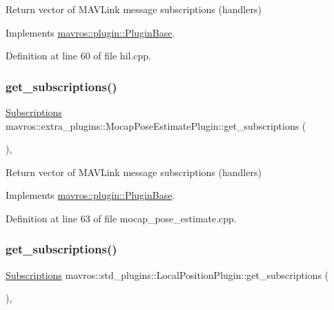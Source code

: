 Return vector of M\+A\+V\+Link message subscriptions (handlers) 



Implements \mbox{\hyperlink{group__plugin_gaf4e23fec6d7436a62cbf0942a2e5791c}{mavros\+::plugin\+::\+Plugin\+Base}}.



Definition at line 60 of file hil.\+cpp.

\mbox{\label{group__plugin_gad79e8a39bc49a479f78b9222cc7cc68a}} 
\subsubsection{\texorpdfstring{get\_subscriptions()}{get\_subscriptions()}\hspace{0.1cm}{\footnotesize\ttfamily [23/41]}}
{\footnotesize\ttfamily \mbox{\hyperlink{group__plugin_ga8967d61fc77040e0c3ea5a4585d62a09}{Subscriptions}} mavros\+::extra\+\_\+plugins\+::\+Mocap\+Pose\+Estimate\+Plugin\+::get\+\_\+subscriptions (\begin{DoxyParamCaption}{ }\end{DoxyParamCaption})\hspace{0.3cm}{\ttfamily [inline]}, {\ttfamily [virtual]}}



Return vector of M\+A\+V\+Link message subscriptions (handlers) 



Implements \mbox{\hyperlink{group__plugin_gaf4e23fec6d7436a62cbf0942a2e5791c}{mavros\+::plugin\+::\+Plugin\+Base}}.



Definition at line 63 of file mocap\+\_\+pose\+\_\+estimate.\+cpp.

\mbox{\label{group__plugin_ga45d714bacb570023793b00c91a7695af}} 
\subsubsection{\texorpdfstring{get\_subscriptions()}{get\_subscriptions()}\hspace{0.1cm}{\footnotesize\ttfamily [24/41]}}
{\footnotesize\ttfamily \mbox{\hyperlink{group__plugin_ga8967d61fc77040e0c3ea5a4585d62a09}{Subscriptions}} mavros\+::std\+\_\+plugins\+::\+Local\+Position\+Plugin\+::get\+\_\+subscriptions (\begin{DoxyParamCaption}{ }\end{DoxyParamCaption})\hspace{0.3cm}{\ttfamily [inline]}, {\ttfamily [virtual]}}



